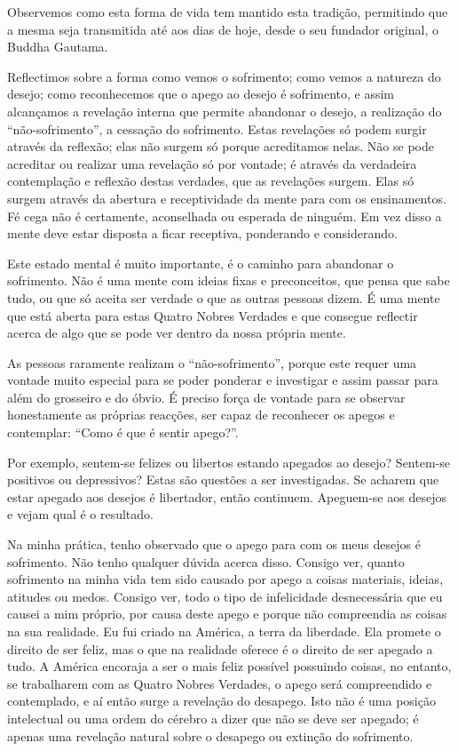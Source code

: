 Observemos como esta forma de vida tem mantido esta tradição, permitindo que a
mesma seja transmitida até aos dias de hoje, desde o seu fundador original, o
Buddha Gautama.

Reflectimos sobre a forma como vemos o sofrimento; como vemos a natureza do
desejo; como reconhecemos que o apego ao desejo é sofrimento, e assim alcançamos
a revelação interna que permite abandonar o desejo, a realização do
“não-sofrimento”, a cessação do sofrimento. Estas revelações só podem surgir
através da reflexão; elas não surgem só porque acreditamos nelas. Não se pode
acreditar ou realizar uma revelação só por vontade; é através da verdadeira
contemplação e reflexão destas verdades, que as revelações surgem. Elas só
surgem através da abertura e receptividade da mente para com os ensinamentos. Fé
cega não é certamente, aconselhada ou esperada de ninguém. Em vez disso a mente
deve estar disposta a ficar receptiva, ponderando e considerando.

Este estado mental é muito importante, é o caminho para abandonar o sofrimento.
Não é uma mente com ideias fixas e preconceitos, que pensa que sabe tudo, ou que
só aceita ser verdade o que as outras pessoas dizem. É uma mente que está aberta
para estas Quatro Nobres Verdades e que consegue reflectir acerca de algo que se
pode ver dentro da nossa própria mente.

As pessoas raramente realizam o “não-sofrimento”, porque este requer uma vontade
muito especial para se poder ponderar e investigar e assim passar para além do
grosseiro e do óbvio. É preciso força de vontade para se observar honestamente
as próprias reacções, ser capaz de reconhecer os apegos e contemplar: “Como é
que é sentir apego?”.

Por exemplo, sentem-se felizes ou libertos estando apegados ao desejo?
Sentem-se positivos ou depressivos? Estas são questões a ser investigadas. Se
acharem que estar apegado aos desejos é libertador, então continuem. Apeguem-se
aos desejos e vejam qual é o resultado.

Na minha prática, tenho observado que o apego para com os meus desejos é
sofrimento. Não tenho qualquer dúvida acerca disso. Consigo ver, quanto
sofrimento na minha vida tem sido causado por apego a coisas materiais, ideias,
atitudes ou medos. Consigo ver, todo o tipo de infelicidade desnecessária que eu
causei a mim próprio, por causa deste apego e porque não compreendia as coisas
na sua realidade. Eu fui criado na América, a terra da liberdade. Ela promete o
direito de ser feliz, mas o que na realidade oferece é o direito de ser apegado
a tudo. A América encoraja a ser o mais feliz possível possuindo coisas, no
entanto, se trabalharem com as Quatro Nobres Verdades, o apego será compreendido
e contemplado, e aí então surge a revelação do desapego. Isto não é uma posição
intelectual ou uma ordem do cérebro a dizer que não se deve ser apegado; é
apenas uma revelação natural sobre o desapego ou extinção do sofrimento.

